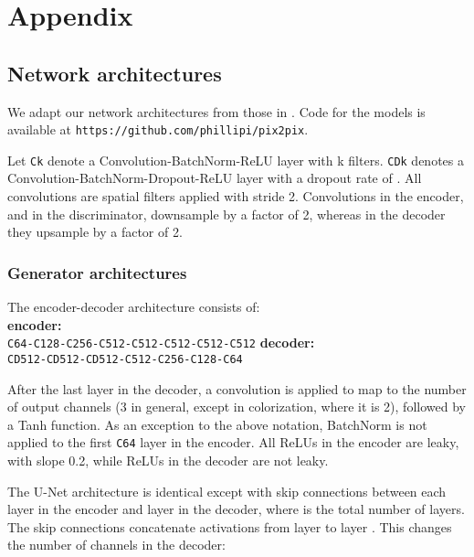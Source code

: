 \documentclass[10pt,twocolumn,letterpaper]{article}
\begin{document}
\clearpage{\thispagestyle{empty}\cleardoublepage}
{\small


}


\clearpage

\section{Appendix}

\subsection{Network architectures}

We adapt our network architectures from those in \cite{radford2015unsupervised}. Code for the models is available at \texttt{https://github.com/phillipi/pix2pix}.

Let \texttt{Ck} denote a Convolution-BatchNorm-ReLU layer with k filters. \texttt{CDk} denotes a Convolution-BatchNorm-Dropout-ReLU layer with a dropout rate of . All convolutions are  spatial filters applied with stride 2. Convolutions in the encoder, and in the discriminator, downsample by a factor of 2, whereas in the decoder they upsample by a factor of 2.

\subsubsection{Generator architectures}

The encoder-decoder architecture consists of:\\
{\bf encoder:}\\
\texttt{C64-C128-C256-C512-C512-C512-C512-C512}
{\bf decoder:}\\
\texttt{CD512-CD512-CD512-C512-C256-C128-C64}

After the last layer in the decoder, a convolution is applied to map to the number of output channels (3 in general, except in colorization, where it is 2), followed by a Tanh function. As an exception to the above notation, BatchNorm is not applied to the first \texttt{C64} layer in the encoder. All ReLUs in the encoder are leaky, with slope 0.2, while ReLUs in the decoder are not leaky.

The U-Net architecture is identical except with skip connections between each layer  in the encoder and layer  in the decoder, where  is the total number of layers. The skip connections concatenate activations from layer  to layer . This changes the number of channels in the decoder:
\end{document}

